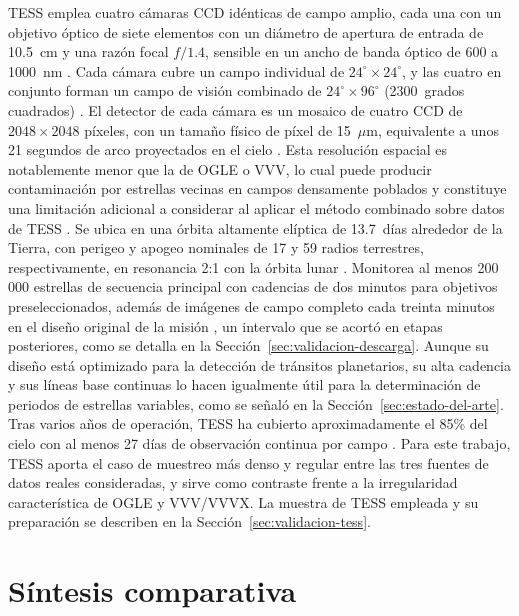 \documentclass[12pt,letterpaper,oneside]{book}
\begin{document}
TESS emplea cuatro c\'amaras CCD id\'enticas de campo amplio, cada una con un objetivo \'optico de siete elementos con un di\'ametro de apertura de entrada de 10.5~cm y una raz\'on focal $f/1.4$, sensible en un ancho de banda \'optico de 600 a 1000~nm \citep{ricker_2015}. Cada c\'amara cubre un campo individual de $24^\circ\times24^\circ$, y las cuatro en conjunto forman un campo de visi\'on combinado de $24^\circ\times96^\circ$ (2300~grados cuadrados) \citep{ricker_2015}. El detector de cada c\'amara es un mosaico de cuatro CCD de $2048\times2048$ p\'ixeles, con un tama\~no f\'isico de p\'ixel de 15~$\mu$m, equivalente a unos 21 segundos de arco proyectados en el cielo \citep{ricker_2015}. Esta resoluci\'on espacial es notablemente menor que la de OGLE o VVV, lo cual puede producir contaminaci\'on por estrellas vecinas en campos densamente poblados y constituye una limitaci\'on adicional a considerar al aplicar el m\'etodo combinado sobre datos de TESS \citep{Elizabethson2023}. Se ubica en una \'orbita altamente el\'iptica de 13.7~d\'ias alrededor de la Tierra, con perigeo y apogeo nominales de 17 y 59 radios terrestres, respectivamente, en resonancia 2:1 con la \'orbita lunar \citep{ricker_2015}. Monitorea al menos 200\,000 estrellas de secuencia principal con cadencias de dos minutos para objetivos preseleccionados, adem\'as de im\'agenes de campo completo cada treinta minutos en el dise\~no original de la misi\'on \citep{ricker_2015}, un intervalo que se acort\'o en etapas posteriores, como se detalla en la Secci\'on~\ref{sec:validacion-descarga}. Aunque su dise\~no est\'a optimizado para la detecci\'on de tr\'ansitos planetarios, su alta cadencia y sus l\'ineas base continuas lo hacen igualmente \'util para la determinaci\'on de periodos de estrellas variables, como se se\~nal\'o en la Secci\'on~\ref{sec:estado-del-arte}. Tras varios a\~nos de operaci\'on, TESS ha cubierto aproximadamente el 85\% del cielo con al menos 27 d\'ias de observaci\'on continua por campo \citep{Elizabethson2023}. Para este trabajo, TESS aporta el caso de muestreo m\'as denso y regular entre las tres fuentes de datos reales consideradas, y sirve como contraste frente a la irregularidad caracter\'istica de OGLE y VVV/VVVX. La muestra de TESS empleada y su preparaci\'on se describen en la Secci\'on~\ref{sec:validacion-tess}.

\section{S\'intesis comparativa}
\label{sec:sintesis-datos}
\end{document}
